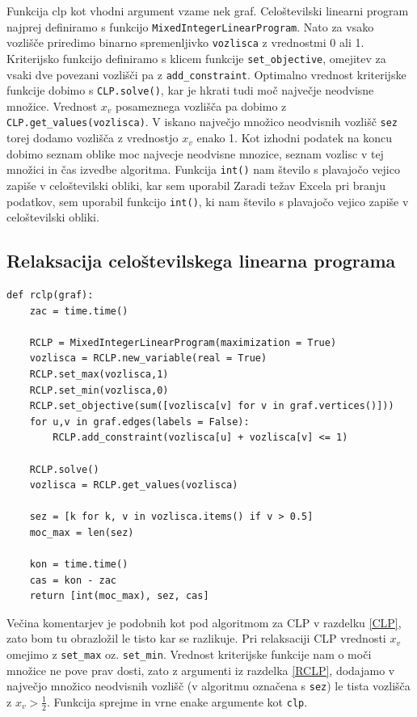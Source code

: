 \documentclass[a4paper, 12 pt]{article}
\theoremstyle{definition}
\theoremstyle{plain}
\theoremstyle{remark}
\begin{document}
Funkcija clp kot vhodni argument vzame nek graf. Celoštevilski linearni program najprej definiramo s funkcijo \verb|MixedIntegerLinearProgram|. Nato za vsako vozlišče priredimo binarno spremenljivko \verb|vozlisca| z vrednostmi 0 ali 1. Kriterijsko funkcijo definiramo s klicem funkcije \verb|set_objective|, omejitev za vsaki dve povezani vozlišči pa z \verb|add_constraint|. Optimalno vrednost kriterijske funkcije dobimo s \verb|CLP.solve()|, kar je hkrati tudi moč največje neodvisne množice. Vrednost $x_v$ posameznega vozlišča pa dobimo z \verb|CLP.get_values(vozlisca)|. V iskano največjo množico neodvisnih vozlišč \verb|sez| torej dodamo vozlišča z vrednostjo $x_v$ enako 1. Kot izhodni podatek na koncu dobimo seznam oblike moc najvecje neodvisne mnozice, seznam vozlisc v tej množici in čas izvedbe algoritma. Funkcija \verb|int()| nam število s plavajočo vejico zapiše v celoštevilski obliki, kar sem uporabil Zaradi težav Excela pri branju podatkov, sem uporabil funkcijo \verb|int()|, ki nam število s plavajočo vejico zapiše v celoštevilski obliki. 



\subsection{Relaksacija celoštevilskega linearna programa}
\begin{verbatim}
def rclp(graf):
    zac = time.time()

    RCLP = MixedIntegerLinearProgram(maximization = True)
    vozlisca = RCLP.new_variable(real = True)
    RCLP.set_max(vozlisca,1)
    RCLP.set_min(vozlisca,0)
    RCLP.set_objective(sum([vozlisca[v] for v in graf.vertices()]))
    for u,v in graf.edges(labels = False):
        RCLP.add_constraint(vozlisca[u] + vozlisca[v] <= 1)

    RCLP.solve()
    vozlisca = RCLP.get_values(vozlisca)

    sez = [k for k, v in vozlisca.items() if v > 0.5]
    moc_max = len(sez)

    kon = time.time()
    cas = kon - zac
    return [int(moc_max), sez, cas]
\end{verbatim}
Večina komentarjev je podobnih kot pod algoritmom za CLP v razdelku \ref{CLP}, zato bom tu obrazložil le tisto kar se razlikuje. Pri relaksaciji CLP vrednosti $x_v$ omejimo z \verb|set_max| oz. \verb|set_min|. Vrednost kriterijske funkcije nam o moči množice ne pove prav dosti, zato z argumenti iz razdelka \ref{RCLP}, dodajamo v največjo množico neodvisnih vozlišč (v algoritmu označena s \verb|sez|) le tista vozlišča z $x_v > \frac{1}{2}$. Funkcija sprejme in vrne enake argumente kot \verb|clp|.
\end{document}
